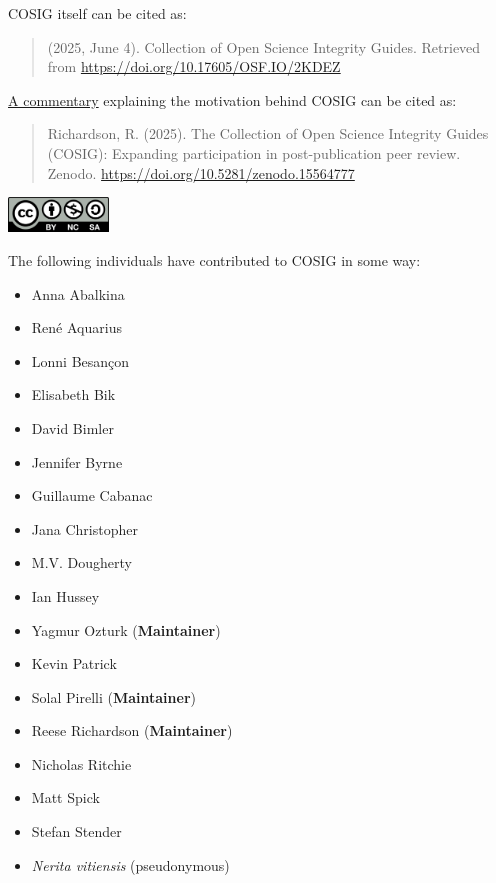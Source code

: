 \documentclass[letterpaper, 12pt]{article}
\begin{document}
COSIG itself can be cited as:

\begin{quote}
    (2025, June 4). Collection of Open Science Integrity Guides. Retrieved from \href{https://doi.org/10.17605/OSF.IO/2KDEZ}{https://doi.org/10.17605/OSF.IO/2KDEZ}
\end{quote}

\href{https://doi.org/10.5281/zenodo.15564777}{A commentary} explaining the motivation behind COSIG can be cited as:
\begin{quote}
    Richardson, R. (2025). The Collection of Open Science Integrity Guides (COSIG): Expanding participation in post-publication peer review. Zenodo. \href{https://doi.org/10.5281/zenodo.15564777}{https://doi.org/10.5281/zenodo.15564777}
\end{quote}

\includegraphics[width=0.2\textwidth]{img/home/Cc-by-nc-sa_icon.svg.png}

\pagebreak

The following individuals have contributed to COSIG in some way:

\begin{itemize}
    \setlength\itemsep{-0.5em}
    \item Anna Abalkina 
    \item Ren\'e Aquarius 
    \item Lonni Besan\c{c}on 
    \item Elisabeth Bik 
    \item David Bimler 
    \item Jennifer Byrne 
    \item Guillaume Cabanac 
    \item Jana Christopher 
    \item M.V. Dougherty 
    \item Ian Hussey 
    \item Yagmur Ozturk  (\textbf{Maintainer})
    \item Kevin Patrick 
    \item Solal Pirelli  (\textbf{Maintainer})
    \item Reese Richardson  (\textbf{Maintainer})
    \item Nicholas Ritchie 
    \item Matt Spick 
    \item Stefan Stender 
    \item \textit{Nerita vitiensis} (pseudonymous)
\end{itemize}
\end{document}
